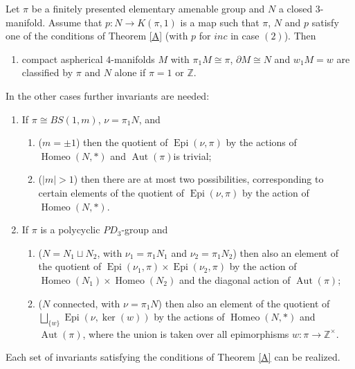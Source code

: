 \documentclass[10pt,a4paper]{amsart}
\DeclareMathOperator{\Aut}{Aut}
\DeclareMathOperator{\Epi}{Epi}
\DeclareMathOperator{\Homeo}{Homeo}
\newcommand{\Z}{\mathbb Z}
\begin{document}
\begin{theorem}
\label{thmD}
Let $\pi$ be a finitely presented elementary amenable group and $N$ a closed $3$-manifold.
Assume that $p:N\to{K(\pi,1)}$ is a map such that $\pi$, $N$ and $p$ 
satisfy one of the conditions of Theorem \ref{A} (with $p$ for $inc$ in case $(2)$).
Then 
\begin{enumerate}
\item{} compact aspherical $4$-manifolds $M$ with $\pi_1M\cong\pi$, $\partial{M}\cong{N}$
and $w_1M=w$ are classified by $\pi$ and $N$ alone if 
$\pi=1$ or $\Z$.
\end{enumerate}
In the other cases further invariants are needed:

\begin{enumerate}
\addtocounter{enumi}{1}
\item{}If $\pi\cong{BS(1,m)}$, $\nu=\pi_1N$, and
\begin{enumerate}
\item($m=\pm1$) then  the quotient of $\Epi(\nu,\pi)$  by the actions of $\Homeo(N,*)$ and $\Aut(\pi)$is trivial;
\item($|m|>1$) then there are at most two possibilities, corresponding to certain elements of the quotient of $\Epi(\nu,\pi)$ by the action of $\Homeo(N,*)$.  
\end{enumerate}
\item{If} $\pi$ is a polycyclic $PD_3$-group and
\begin{enumerate}
\item($N=N_1\sqcup{N_2}$, with $\nu_1=\pi_1N_1$ and $\nu_2=\pi_1N_2$)
then also an element of the quotient of 
$\Epi(\nu_1,\pi)\times{\Epi(\nu_2,\pi)}$ by the action of $\Homeo(N_1)\times{\Homeo(N_2)}$ and the diagonal action of $\Aut(\pi)$; 
\item($N$ connected, with $\nu=\pi_1N$) then also an element of the quotient of\\
 $\bigsqcup_{\{w\}}\Epi(\nu,\ker(w))$ 
by the actions of $\Homeo(N,*)$ and $\Aut(\pi)$, where the union is taken over all  epimorphisms $w:\pi\to\Z^\times$.
\end{enumerate}
\end{enumerate}
Each set of invariants satisfying the conditions of Theorem \ref{A} can be realized.
\end{theorem}
\end{document}
